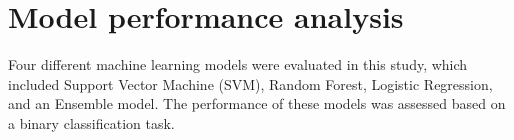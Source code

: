 \documentclass[12pt]{report}
\begin{document}


\section*{Model performance analysis}
Four different machine learning models were evaluated in this study, which
included Support Vector Machine (SVM), Random Forest, Logistic Regression, and
an Ensemble model. The performance of these models was assessed based on a
binary classification task.\\
\end{document}
